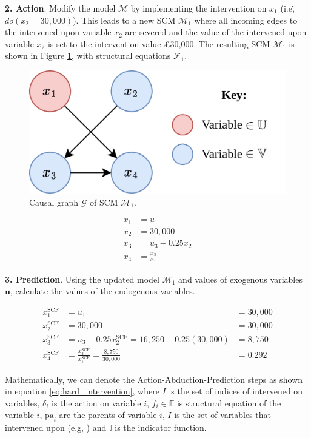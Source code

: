 \textbf{2. Action}. Modify the model $\mathcal{M}$ by implementing the intervention on $x_1$ (i.e\., $do(x_2=30,000)$). This leads to a new SCM $\mathcal{M}_1$ where all incoming edges to the intervened upon variable $x_2$ are severed and the value of the intervened upon variable $x_2$ is set to the intervention value £30,000. The resulting SCM $\mathcal{M}_1$ is shown in Figure \ref{fig:toy_scm_severed}, with structural equations $\mathcal{F}_1$.

\begin{figure}[!htb]
	\centering
	\includegraphics[width=0.6\linewidth]{images/draw.io/Simple SCM Severed.png}
	\caption{Causal graph $\mathcal{G}$ of SCM $\mathcal{M}_1$.}
	\label{fig:toy_scm_severed}
\end{figure}

\begin{align}
	x_1 & = u_1 \\ \nonumber
	x_2 & = 30,000 \\ \nonumber
	x_3 & = u_3 - 0.25x_2 \\ \nonumber %
	x_4 & = \frac{x_3}{x_1} %
\end{align}

\textbf{3. Prediction}. Using the updated model $\mathcal{M}_1$ and values of exogenous variables $\mathbf{u}$, calculate the values of the endogenous variables.

\begin{align}
	x^{\text{SCF}}_1 & = u_1 &  = 30,000 \\ \nonumber
	x^{\text{SCF}}_2 & = 30,000 & = 30,000 \\ \nonumber
	x^{\text{SCF}}_3 & = u_3 - 0.25x^{\text{SCF}}_2 = 16,250 - 0.25(30,000) & = 8,750 \\ \nonumber
	x^{\text{SCF}}_4 & = \frac{x^{\text{SCF}}_3}{x^{\text{SCF}}_1} = \frac{8,750}{30,000} & = 0.292
\end{align}

Mathematically, we can denote the Action-Abduction-Prediction steps as shown in equation \ref{eq:hard_intervention}, where $I$ is the set of indices of intervened on variables, $\delta_i$ is the action on variable $i$, $f_i \in \mathbb{F}$ is structural equation of the variable $i$,  $\text{pa}_i$ are the parents of variable $i$, $I$ is the set of variables that intervened upon (e.g, ) and $\mathbb{I}$ is the indicator function. 

